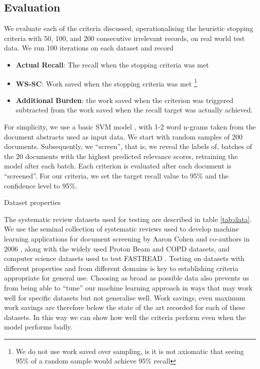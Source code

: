 \documentclass{bmcart}
\begin{document}
	\subsection*{Evaluation}
	
	We evaluate each of the criteria discussed, operationalising the heuristic stopping criteria with 50, 100, and 200 consecutive irrelevant records, on real world test data. We run 100 iterations on each dataset and record 
	\begin{itemize}
		\item \textbf{Actual Recall}: The recall when the stopping criteria was met
		\item \textbf{WS-SC}: Work saved when the stopping criteria was met \footnote{We do not use work saved over sampling, is it is not axiomatic that seeing 95\% of a random sample would achieve 95\% recall}
		\item \textbf{Additional Burden}: the work saved when the criterion was triggered subtracted from the work saved when the recall target was actually achieved.

	\end{itemize}
	For simplicity, we use a basic SVM model \cite{Cortes95, Pedregosa2011}, with 1-2 word n-grams taken from the document abstracts used as input data. We start with random samples of 200 documents. Subsequently, we ``screen'', that is, we reveal the labels of, batches of the 20 documents with the highest predicted relevance scores, retraining the model after each batch. Each criterion is evaluated after each document is ``screened''.
	 For our criteria, we set the target recall value to 95\% and the confidence level to 95\%.
	
	
	\begin{table}
		
		\caption{Dataset properties}
		\label{tab:data}
	\end{table}
	
	The systematic review datasets used for testing are described in table \ref{tab:data}. We use the seminal collection of systematic reviews used to develop machine learning applications for document screening by Aaron Cohen and co-authors in 2006 \cite{Cohen2006}, along with the widely used Proton Beam \cite{Terasawa2009} and COPD \cite{Castaldi2009} datasets, and computer science datasets used to test FASTREAD \cite{Yu2019}. Testing on datasets with different properties and from different domains is key to establishing criteria appropriate for general use. Choosing as broad as possible data also prevents us from being able to ``tune'' our machine learning approach in ways that may work well for specific datasets but not generalise well. Work savings, even maximum work savings are therefore below the state of the art recorded for each of these datasets. In this way we can show how well the criteria perform even when the model performs badly.
	
\end{document}
